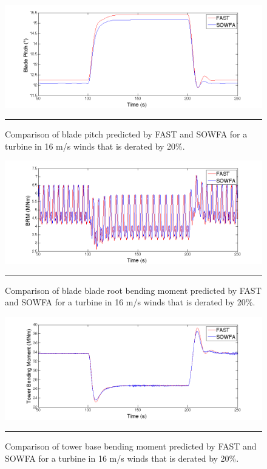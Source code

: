 \begin{figure}[htbp]	\label{fig6-4}
	\centering
		\includegraphics[trim = {1cm 0 2cm 0}, clip, width = \linewidth]{Figures/ch6Figures/fig6-4.png}
		\rule{35em}{0.5pt}
	\caption{Comparison of blade pitch predicted by FAST and SOWFA for a turbine in 16 m/s winds that is derated by 20\%.}
\end{figure}

\begin{figure}[htbp]	\label{fig6-5}
	\centering
		\includegraphics[trim = {1cm 0 2cm 0}, clip, width = \linewidth]{Figures/ch6Figures/fig6-5.png}
		\rule{35em}{0.5pt}
	\caption{Comparison of blade blade root bending moment predicted by FAST and SOWFA for a turbine in 16 m/s winds that is derated by 20\%.}
\end{figure}

\begin{figure}[htbp]	\label{fig6-6}
	\centering
		\includegraphics[trim = {1cm 0 2cm 0}, clip, width = \linewidth]{Figures/ch6Figures/fig6-6.png}
		\rule{35em}{0.5pt}
	\caption{Comparison of tower base bending moment predicted by FAST and SOWFA for a turbine in 16 m/s winds that is derated by 20\%.}
\end{figure}



